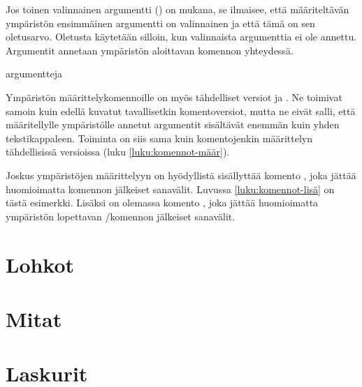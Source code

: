 Jos toinen valinnainen argumentti () on mukana, se
ilmaisee, että määriteltävän ympäristön ensimmäinen argumentti on
valinnainen ja että tämä on sen ole\-tus\-arvo. Oletusta käytetään
silloin, kun valinnaista argumenttia ei ole annettu. Argumentit annetaan
ympäristön aloittavan komennon yhteydessä.

\begin{koodilohkosis}
  \begin{ymp}[valinnainen]{argu}{mentteja}
  \end{ymp}
\end{koodilohkosis}

Ympäristön määrittelykomennoille on myös tähdelliset versiot
 ja . Ne
toimivat samoin kuin edellä kuvatut tavallisetkin komentoversiot, mutta
ne eivät salli, että määritellylle ympäristölle annetut argumentit
sisältävät enemmän kuin yhden tekstikappaleen. Toiminta on siis sama
kuin komentojenkin määrittelyn tähdellisissä versioissa (luku
\ref{luku:komennot-määr}).

\begin{koodilohkosis}
  \newenvironment*   {nimi}[n][oletus]{aloitus}{lopetus}
  \renewenvironment* {nimi}[n][oletus]{aloitus}{lopetus}
\end{koodilohkosis}

Joskus ympäristöjen määrittelyyn on hyödyllistä sisällyttää komento
, joka jättää huomioimatta komennon jälkeiset
sanavälit. Luvussa \ref{luku:komennot-lisä} on tästä esimerkki. Lisäksi
on olemassa komento , joka
jättää huomioimatta ympäristön lopettavan \-/komennon
jälkeiset sanavälit.

\section{Lohkot}
\section{Mitat}
\label{luku:mitat}
\section{Laskurit}
